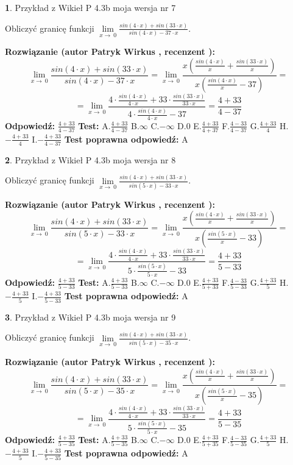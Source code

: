 \documentclass[12pt, a4paper]{article}
\theoremstyle{definition} %
\newtheorem{zad}{}
\newcommand{\zadStart}[1]{\begin{zad}#1\newline}
\newcommand{\zadStop}{\end{zad}}
\newcommand{\rozwStart}[2]{\noindent \textbf{Rozwiązanie (autor #1 , recenzent #2): }\newline}
\newcommand{\rozwStop}{\newline}
\newcommand{\odpStart}{\noindent \textbf{Odpowiedź:}\newline}
\newcommand{\odpStop}{\newline}
\newcommand{\testStart}{\noindent \textbf{Test:}\newline}
\newcommand{\testStop}{\newline}
\newcommand{\kluczStart}{\noindent \textbf{Test poprawna odpowiedź:}\newline}
\newcommand{\kluczStop}{\newline}
\begin{document}
\zadStart{Przykład z Wikieł P 4.3b moja wersja nr 7}


Obliczyć granicę funkcji $\lim\limits_{x\to\ 0}\frac{sin(4 \cdot x)+sin(33 \cdot x)}{sin(4 \cdot x)-37 \cdot x}$.
\zadStop
\rozwStart{Patryk Wirkus}{}
$$\lim\limits_{x\to\ 0}\frac{sin(4 \cdot x)+sin(33 \cdot x)}{sin(4 \cdot x)-37 \cdot x}=\lim\limits_{x\to\ 0}\frac{x(\frac{sin(4 \cdot x)}{x}+\frac{sin(33 \cdot x)}{x})}{x(\frac{sin(4 \cdot x)}{x}-37)}=$$
$$=\lim\limits_{x\to\ 0}\frac{4 \cdot \frac{sin(4 \cdot x)}{4 \cdot x}+33 \cdot \frac{sin(33 \cdot x)}{33 \cdot x}}{4 \cdot \frac{sin(4 \cdot x)}{4 \cdot x}-37}=\frac{4+33}{4-37}$$
\rozwStop
\odpStart
$\frac{4+33}{4-37}$
\odpStop
\testStart
A.$\frac{4+33}{4-37}$
B.$\infty$
C.$-\infty$
D.$0$
E.$\frac{4+33}{4+37}$
F.$\frac{4-33}{4-37}$
G.$\frac{4+33}{4}$
H.$-\frac{4+33}{4}$
I.$-\frac{4+33}{4-37}$
\testStop
\kluczStart
A
\kluczStop



\zadStart{Przykład z Wikieł P 4.3b moja wersja nr 8}


Obliczyć granicę funkcji $\lim\limits_{x\to\ 0}\frac{sin(4 \cdot x)+sin(33 \cdot x)}{sin(5 \cdot x)-33 \cdot x}$.
\zadStop
\rozwStart{Patryk Wirkus}{}
$$\lim\limits_{x\to\ 0}\frac{sin(4 \cdot x)+sin(33 \cdot x)}{sin(5 \cdot x)-33 \cdot x}=\lim\limits_{x\to\ 0}\frac{x(\frac{sin(4 \cdot x)}{x}+\frac{sin(33 \cdot x)}{x})}{x(\frac{sin(5 \cdot x)}{x}-33)}=$$
$$=\lim\limits_{x\to\ 0}\frac{4 \cdot \frac{sin(4 \cdot x)}{4 \cdot x}+33 \cdot \frac{sin(33 \cdot x)}{33 \cdot x}}{5 \cdot \frac{sin(5 \cdot x)}{5 \cdot x}-33}=\frac{4+33}{5-33}$$
\rozwStop
\odpStart
$\frac{4+33}{5-33}$
\odpStop
\testStart
A.$\frac{4+33}{5-33}$
B.$\infty$
C.$-\infty$
D.$0$
E.$\frac{4+33}{5+33}$
F.$\frac{4-33}{5-33}$
G.$\frac{4+33}{5}$
H.$-\frac{4+33}{5}$
I.$-\frac{4+33}{5-33}$
\testStop
\kluczStart
A
\kluczStop



\zadStart{Przykład z Wikieł P 4.3b moja wersja nr 9}


Obliczyć granicę funkcji $\lim\limits_{x\to\ 0}\frac{sin(4 \cdot x)+sin(33 \cdot x)}{sin(5 \cdot x)-35 \cdot x}$.
\zadStop
\rozwStart{Patryk Wirkus}{}
$$\lim\limits_{x\to\ 0}\frac{sin(4 \cdot x)+sin(33 \cdot x)}{sin(5 \cdot x)-35 \cdot x}=\lim\limits_{x\to\ 0}\frac{x(\frac{sin(4 \cdot x)}{x}+\frac{sin(33 \cdot x)}{x})}{x(\frac{sin(5 \cdot x)}{x}-35)}=$$
$$=\lim\limits_{x\to\ 0}\frac{4 \cdot \frac{sin(4 \cdot x)}{4 \cdot x}+33 \cdot \frac{sin(33 \cdot x)}{33 \cdot x}}{5 \cdot \frac{sin(5 \cdot x)}{5 \cdot x}-35}=\frac{4+33}{5-35}$$
\rozwStop
\odpStart
$\frac{4+33}{5-35}$
\odpStop
\testStart
A.$\frac{4+33}{5-35}$
B.$\infty$
C.$-\infty$
D.$0$
E.$\frac{4+33}{5+35}$
F.$\frac{4-33}{5-35}$
G.$\frac{4+33}{5}$
H.$-\frac{4+33}{5}$
I.$-\frac{4+33}{5-35}$
\testStop
\kluczStart
A
\kluczStop
\end{document}
